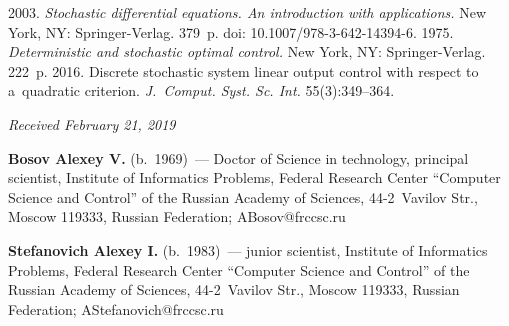 \begin{multicols}{2}
{{\begin{thebibliography}{99}
\columnbreak


 2003. \textit{Stochastic differential equations. An 
introduction with applications.} New York, NY: Springer-Verlag. 379~p.
doi: 10.1007/978-3-642-14394-6.
 1975. \textit{Deterministic and 
stochastic optimal control.} New York, NY: Springer-Verlag. 222~p.
 2016. Discrete stochastic system linear output control 
with respect to a~quadratic criterion. \textit{J.~Comput. Syst. Sc. 
Int.} 55(3):349--364. 
\end{thebibliography}

 }
 }

\end{multicols}


\hfill{\small\textit{Received February 21, 2019}}


     

\Contr

\noindent
\textbf{Bosov Alexey V.} (b.\ 1969)~--- Doctor of Science in technology, principal 
scientist, Institute of Informatics Problems, Federal Research Center ``Computer 
Science and Control'' of the Russian Academy of Sciences, 44-2~Vavilov Str., 
Moscow 119333, Russian Federation; \mbox{ABosov@frccsc.ru}


\vspace*{3pt}

\noindent
\textbf{Stefanovich Alexey I.} (b.\ 1983)~--- junior scientist, Institute of 
Informatics Problems, Federal Research Center ``Computer Science and Control'' 
of the Russian Academy of Sciences, 44-2~Vavilov Str., Moscow 119333, Russian 
Federation; \mbox{AStefanovich@frccsc.ru}
\label{end\stat}

\renewcommand{\bibname}{\protect\rm Литература}  
      
